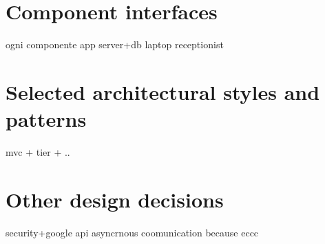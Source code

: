 \begin{figure}[H]
  \label{MobileUserSD}
  \centering
    \caption{}
\end{figure} 


\begin{figure}[H]
  \label{NotificationsSD}
  \centering
    \caption{}
\end{figure} 








\section{Component interfaces}
ogni componente
app
server+db
laptop receptionist

\section{Selected architectural styles and patterns}
mvc + tier + ..

\section{Other design decisions}

security+google api
asyncrnous coomunication because eccc
